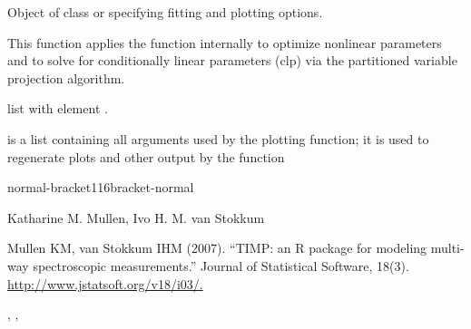 \documentclass{article}
\begin{document}
\begin{Arguments}
\begin{ldescription}
{}

\item[\code{opt}] Object of class  or  specifying 
fitting and plotting options. 
\end{ldescription}
\end{Arguments}
\begin{Details}\relax
This function applies the  function internally to 
optimize nonlinear parameters and to solve for conditionally linear parameters
(clp) via the partitioned variable projection algorithm.
\end{Details}
\begin{Value}
list with element .  
\begin{ldescription}
\item[\code{toPlotter}] is a list containing all arguments used by the plotting 
function; it is used to regenerate plots and other output by the 
  function
\end{ldescription}

normal-bracket116bracket-normal
\end{Value}
\begin{Author}\relax
Katharine M. Mullen, Ivo H. M. van Stokkum
\end{Author}
\begin{References}\relax
Mullen KM, van Stokkum IHM (2007). 
``TIMP: an R package for modeling
multi-way spectroscopic measurements.'' Journal of Statistical Software,
18(3). \url{http://www.jstatsoft.org/v18/i03/.}
\end{References}
\begin{SeeAlso}\relax
{}, , 
\end{SeeAlso}
\end{document}

